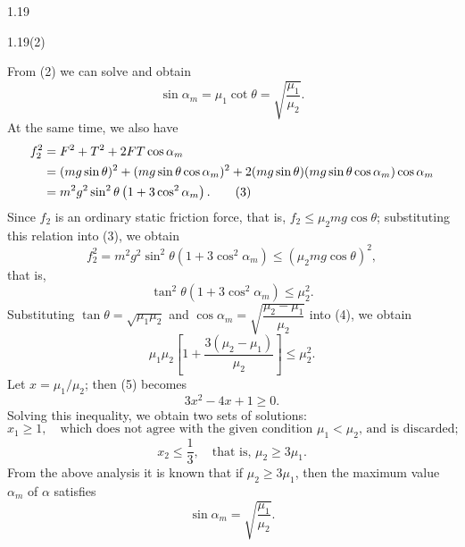\begin{solution}{1.19}
\begin{figbox}{1.19(2)}
\end{figbox}

From (2) we can solve and obtain
\[
\sin\alpha_m=\mu_1\cot\theta=\sqrt{\frac{\mu_1}{\mu_2}}.
\]
At the same time, we also have
\begin{align}
f_2^2&=F^2+T^2+2FT\cos\alpha_m\notag\\
&=(mg\sin\theta)^2+(mg\sin\theta\cos\alpha_m)^2+2(mg\sin\theta)(mg\sin\theta\cos\alpha_m)\cos\alpha_m\notag\\
&=m^2g^2\sin^2\theta\left(1+3\cos^2\alpha_m\right). \tag{3}
\end{align}
Since $f_2$ is an ordinary static friction force, that is, $f_2\leq\mu_2mg\cos\theta$; substituting this relation into (3), we obtain
\[
f_2^2=m^2g^2\sin^2\theta\left(1+3\cos^2\alpha_m\right)\leq\left(\mu_2mg\cos\theta\right)^2,
\]
that is,
\begin{equation}
\tan^2\theta\left(1+3\cos^2\alpha_m\right)\leq\mu_2^2. \tag{4}
\end{equation}
Substituting $\tan\theta=\sqrt{\mu_1\mu_2}$ and $\cos\alpha_m=\sqrt{\dfrac{\mu_2-\mu_1}{\mu_2}}$ into (4), we obtain
\begin{equation}
\mu_1\mu_2\left[1+\frac{3(\mu_2-\mu_1)}{\mu_2}\right]\leq\mu_2^2. \tag{5}
\end{equation}
Let $x=\mu_1/\mu_2$; then (5) becomes
\begin{equation}
3x^2-4x+1\geq0. \tag{6}
\end{equation}
Solving this inequality, we obtain two sets of solutions:
\[
x_1\geq1,\quad\text{which does not agree with the given condition }\mu_1<\mu_2\text{, and is discarded;}
\]
\[
x_2\leq\frac{1}{3},\quad\text{that is, }\mu_2\geq3\mu_1.
\]
From the above analysis it is known that if $\mu_2\geq3\mu_1$, then the maximum value $\alpha_m$ of $\alpha$ satisfies
\[
\sin\alpha_m=\sqrt{\frac{\mu_1}{\mu_2}}.
\]


\end{solution}
